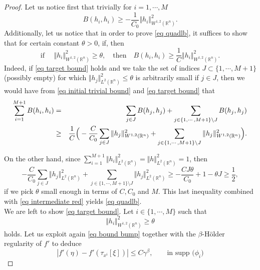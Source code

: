 \documentclass[11pt,letterpaper,reqno]{amsart}
\newcommand{\R}{\mathbb{R}}
\theoremstyle{plain}%
\theoremstyle{definition}
\numberwithin{equation}{section}
\numberwithin{figure}{section}
\begin{document}
\begin{proof}
Let us notice first that trivially for $i=1,\cdots, M$
\begin{equation}\label{eq initial trivial bound}
	B(h_i,h_i) \geq -\frac{1}{C_0}\Vert h_i\Vert_{W^{1,2}(\R^n)}^2.
\end{equation} 
Additionally, let us notice that in order to prove \eqref{eq quadlb}, it suffices to show that for certain constant $\theta>0$, if, then
\begin{equation}\label{eq target bound}
\mbox{if } \quad \Vert h_i\Vert_{W^{1,2}(\R^n)}^2\geq \theta, \quad \mbox{then} \quad	B(h_i,h_i) \geq \frac{1}{C} \Vert h_i\Vert_{W^{1,2}(\R^n)}^2.
\end{equation}
Indeed, if \eqref{eq target bound} holds and we take the set of indices $J \subset \{1,\cdots, M+1\}$ (possibly empty) for which $\Vert h_j\Vert_{L^2(\R^n)}^2 \leq \theta $ is arbitrarily small if $j\in J$, then we would have from \eqref{eq initial trivial bound} and  \eqref{eq target bound} that 
\begin{eqnarray}\notag
	 \sum_{i=1}^{M+1}B(h_{i},h_{i}) &=& \sum_{ j\in J} B(h_j,h_j)+\sum_{ j \in \{1,\cdots, M+1\}\setminus J } B(h_j,h_j)\\ \label{eq intermediate red}
	&\geq& \frac{1}{C}\Big( -\frac{C}{C_0} \sum_{ j\in J}  \Vert h_j\Vert_{W^{1,2}(\R^n)}^2 + \sum_{ j \in \{1,\cdots, M+1\}\setminus J } \Vert h_j\Vert_{W^{1,2}(\R^n)}^2 \Big).
\end{eqnarray}

On the other hand, since $\sum_{i=1}^{M+1} \Vert h_i\Vert_{L^2(\R^n)}^2 = \Vert h\Vert_{L^2(\R^n)}^2=1$, then
\begin{equation*}
  -\frac{C}{C_0} \sum_{ j\in J}  \Vert h_j\Vert_{L^2(\R^n)}^2 + \sum_{ j \in \{1,\cdots, M+1\}\setminus J } \Vert h_j\Vert_{L^2(\R^n)}^2 \geq -\frac{C J \theta }{C_0} +1-\theta J\geq \frac{1}{2},
\end{equation*}
if we pick $\theta$ small enough in terms of $C, C_0$ and $M$. This last inequality combined with \eqref{eq intermediate red} yields \eqref{eq quadlb}.\\

We are left to show \eqref{eq target bound}. Let $i \in \{1,\cdots, M\}$ such that
\begin{equation}\label{eq lower bound hi}
	\Vert h_i\Vert_{W^{1,2}(\R^n)}^2\geq \theta
\end{equation} 
 holds. Let us exploit again \eqref{eq bound bump} together with the $\beta$-H\"older regularity of $f'$ to deduce
\begin{equation}\label{eq potential bound}
 |f'(\eta)-f'(\tau_{x^i}[\xi])| \leq C\gamma^\beta, \qquad \mbox{in supp ({$\phi_i$})}
\end{equation}


\end{proof}
\end{document}
